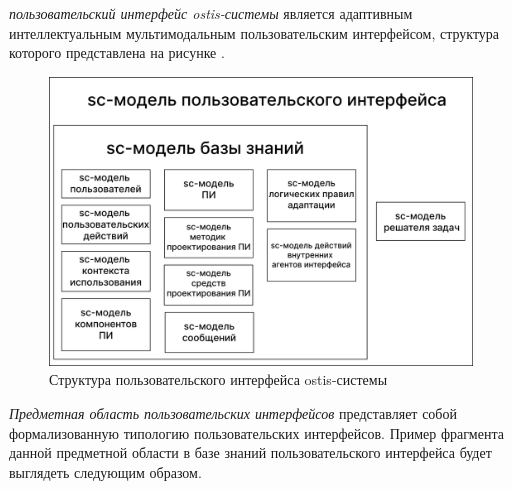 \textit{пользовательский интерфейс ostis-системы} является адаптивным интеллектуальным мультимодальным пользовательским интерфейсом, структура которого представлена на рисунке .

\begin{figure}[H]
	\centering
	\includegraphics[scale=0.3]{author/part4/figures/ui_model.png}
	\caption{Структура пользовательского интерфейса ostis-системы}
	\label{fig:ostis_ui_structure}
\end{figure}

\textit{Предметная область пользовательских интерфейсов} представляет собой формализованную типологию пользовательских интерфейсов. Пример фрагмента данной предметной области в базе знаний пользовательского интерфейса будет выглядеть следующим образом.

\begin{SCn}
\end{SCn}

